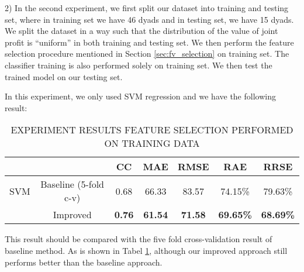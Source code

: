 \documentclass[11pt]{article} %
\begin{document}
2) In the second experiment, we first split our dataset into training and testing set, where in training set we have 46 dyads and in testing set, we have 15 dyads. We split the dataset in a way such that the distribution of the value of joint profit is ``uniform'' in both training and testing set.
We then perform the feature selection procedure mentioned in Section \ref{sec:fv_selection} on training set. The classifier training is also performed solely on training set. We then test the trained model on our testing set.

In this experiment, we only used SVM regression and we have the following result:

\begin{table}
  \centering
  \caption{EXPERIMENT RESULTS FEATURE SELECTION PERFORMED ON TRAINING DATA}
  \begin{tabular}{|c|c|c|c|c|c|c|}
     \hline
         &       & CC & MAE & RMSE & RAE & RRSE\\
     \hline
     SVM & Baseline (5-fold c-v)& 0.68  & 66.33  & 83.57  & 74.15\%  & 79.63\%\\
         & Improved & \textbf{0.76}  & \textbf{61.54 } & \textbf{71.58}  & \textbf{69.65\% } & \textbf{68.69\%}\\
  \hline
  \end{tabular}\label{tab:result3}
\end{table}

This result should be compared with the five fold cross-validation result of baseline method. As is shown in Tabel \ref{tab:result3}, although our improved approach still performs better than the baseline approach.


\end{document}
